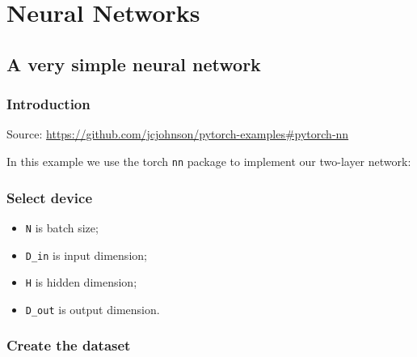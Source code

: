 \documentclass[]{book}
\newenvironment{Shaded}{\begin{snugshade}}{\end{snugshade}}
\newcommand{\CommentTok}[1]{\textcolor[rgb]{0.56,0.35,0.01}{\textit{#1}}}
\newcommand{\KeywordTok}[1]{\textcolor[rgb]{0.13,0.29,0.53}{\textbf{#1}}}
\newcommand{\NormalTok}[1]{#1}
\newcommand{\OperatorTok}[1]{\textcolor[rgb]{0.81,0.36,0.00}{\textbf{#1}}}
\newcommand{\StringTok}[1]{\textcolor[rgb]{0.31,0.60,0.02}{#1}}
\providecommand{\tightlist}{%
  \setlength{\itemsep}{0pt}\setlength{\parskip}{0pt}}
\begin{document}
\hypertarget{part-neural-networks}{%
\part{Neural Networks}\label{part-neural-networks}}

\hypertarget{a-very-simple-neural-network}{%
\chapter{A very simple neural network}\label{a-very-simple-neural-network}}

\hypertarget{introduction-1}{%
\section{Introduction}\label{introduction-1}}

Source: \url{https://github.com/jcjohnson/pytorch-examples\#pytorch-nn}

In this example we use the torch \texttt{nn} package to implement our two-layer network:

\hypertarget{select-device}{%
\section{Select device}\label{select-device}}

\begin{Shaded}
\end{Shaded}

\begin{itemize}
\tightlist
\item
  \texttt{N} is batch size;
\item
  \texttt{D\_in} is input dimension;
\item
  \texttt{H} is hidden dimension;
\item
  \texttt{D\_out} is output dimension.
\end{itemize}

\hypertarget{create-the-dataset}{%
\section{Create the dataset}\label{create-the-dataset}}
\end{document}
